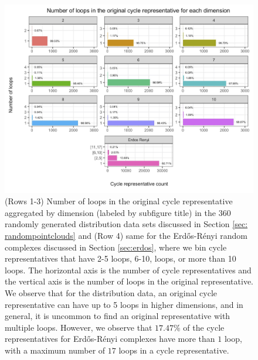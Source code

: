  \begin{figure}[h!]
\begin{center}
\includegraphics[width=\textwidth]{figures/loopsbreakdown.jpg}
\end{center}
\caption{  
(Rows 1-3) Number of loops in the original cycle representative aggregated by dimension (labeled by subfigure title) in the  $360$ randomly generated distribution data sets discussed in Section \ref{sec: randompointclouds} and (Row 4) same for the  Erd\H{o}s-R\'enyi random complexes discussed in Section \ref{sec:erdos}, where we bin cycle representatives that have 2-5 loops, 6-10, loops, or more than 10 loops. The horizontal axis is the number of cycle representatives and the vertical axis is the number of loops in the original representative. We observe that for the distribution data, an original cycle representative can have up to 5 loops in higher dimensions, and in general, it is uncommon to find an original representative with multiple loops. However, we observe that $17.47\%$ of the cycle representatives for Erd\H{o}s-R\'enyi complexes have more than $1$ loop, with a maximum number of $17$ loops in a cycle representative.}
\label{fig:loopsbreakdown}
\end{figure} 

